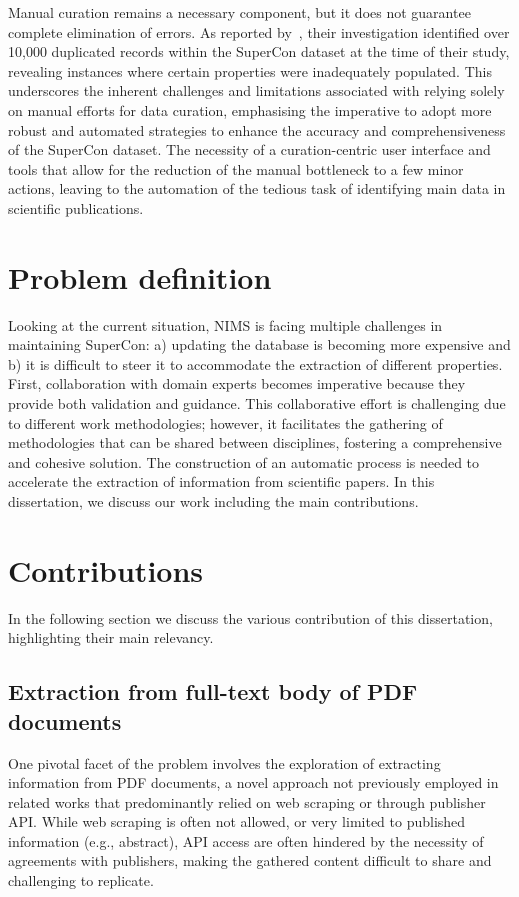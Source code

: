 Manual curation remains a necessary component, but it does not guarantee complete elimination of errors. As reported by~\cite{sommer20223dsc}, their investigation identified over 10,000 duplicated records within the SuperCon dataset at the time of their study, revealing instances where certain properties were inadequately populated. 
This underscores the inherent challenges and limitations associated with relying solely on manual efforts for data curation, emphasising the imperative to adopt more robust and automated strategies to enhance the accuracy and comprehensiveness of the SuperCon dataset.
The necessity of a curation-centric user interface and tools that allow for the reduction of the manual bottleneck to a few minor actions, leaving to the automation of the tedious task of identifying main data in scientific publications.


\section{Problem definition}

Looking at the current situation, NIMS is facing multiple challenges in maintaining SuperCon: a) updating the database is becoming more expensive and b) it is difficult to steer it to accommodate the extraction of different properties. 
First, collaboration with domain experts becomes imperative because they provide both validation and guidance. 
This collaborative effort is challenging due to different work methodologies; however, it facilitates the gathering of methodologies that can be shared between disciplines, fostering a comprehensive and cohesive solution.
The construction of an automatic process is needed to accelerate the extraction of information from scientific papers. In this dissertation, we discuss our work including the main contributions. 

\section{Contributions}
In the following section we discuss the various contribution of this dissertation, highlighting their main relevancy. 

\subsection{Extraction from full-text body of PDF documents}
One pivotal facet of the problem involves the exploration of extracting information from PDF documents, a novel approach not previously employed in related works that predominantly relied on web scraping or through publisher API.
While web scraping is often not allowed, or very limited to published information (e.g., abstract), API access are often hindered by the necessity of agreements with publishers, making the gathered content difficult to share and challenging to replicate.

